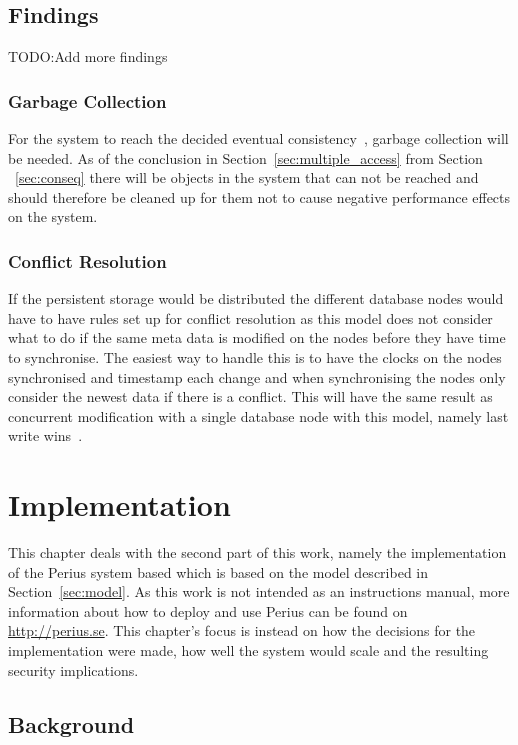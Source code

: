 \documentclass[a4paper,12pt]{article}
\newcommand{\fix}{\colorbox{yellow!30}{TODO:}}
\begin{document}
\subsection{Findings}
\fix Add more findings
\subsubsection{Garbage Collection}
For the system to reach the decided eventual consistency~\cite{KLINGSBO}, garbage collection will be
needed. As of the conclusion in Section~\ref{sec:multiple_access} from Section ~\ref{sec:conseq} 
there will be objects in the system that can not be reached and should therefore be cleaned up for 
them not to cause negative performance effects on the system.

\subsubsection{Conflict Resolution}
If the persistent storage would be distributed the different database nodes would have to have rules
set up for conflict resolution as this model does not consider what to do if the same meta data is
modified on the nodes before they have time to synchronise. The easiest way to handle this is to
have the clocks on the nodes synchronised and timestamp each change and when synchronising the nodes
only consider the newest data if there is a conflict. This will have the same result as concurrent
modification with a single database node with this model, namely last write
wins~\cite{LASTWRITEWINS}.

\newpage 
\section{Implementation} \label{sec:implementation} 
This chapter deals with the second part of this work, namely the implementation of the Perius system
based which is based on the model described in Section~\ref{sec:model}. As this work is not intended
as an instructions manual, more information about how to deploy and use Perius can be found on
\url{http://perius.se}. This chapter's focus is instead on how the decisions for the implementation
were made, how well the system would scale and the resulting security implications.

\subsection{Background}
\end{document}

